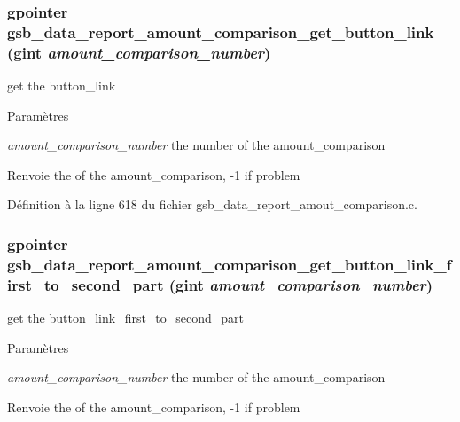 \subsubsection[{gsb\_\-data\_\-report\_\-amount\_\-comparison\_\-get\_\-button\_\-link}]{\setlength{\rightskip}{0pt plus 5cm}gpointer gsb\_\-data\_\-report\_\-amount\_\-comparison\_\-get\_\-button\_\-link (gint {\em amount\_\-comparison\_\-number})}\label{gsb__data__report__amout__comparison_8c_a3df5f1bbd7f70036d8c5614ae41e2bba}
get the button\_\-link


\begin{DoxyParams}{Paramètres}
\item[{\em amount\_\-comparison\_\-number}]the number of the amount\_\-comparison\end{DoxyParams}
\begin{DoxyReturn}{Renvoie}
the of the amount\_\-comparison, -\/1 if problem 
\end{DoxyReturn}


Définition à la ligne 618 du fichier gsb\_\-data\_\-report\_\-amout\_\-comparison.c.

\subsubsection[{gsb\_\-data\_\-report\_\-amount\_\-comparison\_\-get\_\-button\_\-link\_\-first\_\-to\_\-second\_\-part}]{\setlength{\rightskip}{0pt plus 5cm}gpointer gsb\_\-data\_\-report\_\-amount\_\-comparison\_\-get\_\-button\_\-link\_\-first\_\-to\_\-second\_\-part (gint {\em amount\_\-comparison\_\-number})}\label{gsb__data__report__amout__comparison_8c_a21371b634e4c92ceef60b4ff32d288c5}
get the button\_\-link\_\-first\_\-to\_\-second\_\-part


\begin{DoxyParams}{Paramètres}
\item[{\em amount\_\-comparison\_\-number}]the number of the amount\_\-comparison\end{DoxyParams}
\begin{DoxyReturn}{Renvoie}
the of the amount\_\-comparison, -\/1 if problem 
\end{DoxyReturn}


